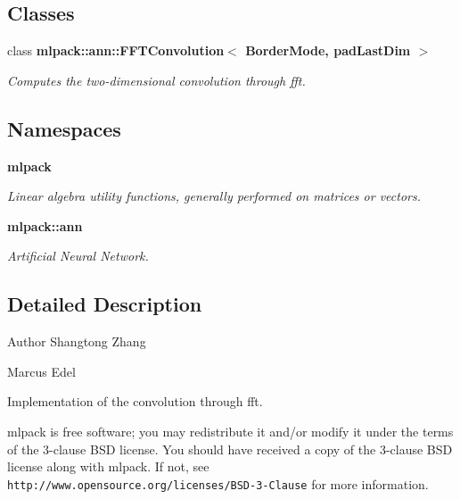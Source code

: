 \subsection*{Classes}
\begin{DoxyCompactItemize}
\item 
class {\bf mlpack\+::ann\+::\+F\+F\+T\+Convolution$<$ Border\+Mode, pad\+Last\+Dim $>$}
\begin{DoxyCompactList}\small\item\em Computes the two-\/dimensional convolution through fft. \end{DoxyCompactList}\end{DoxyCompactItemize}
\subsection*{Namespaces}
\begin{DoxyCompactItemize}
\item 
 {\bf mlpack}
\begin{DoxyCompactList}\small\item\em Linear algebra utility functions, generally performed on matrices or vectors. \end{DoxyCompactList}\item 
 {\bf mlpack\+::ann}
\begin{DoxyCompactList}\small\item\em Artificial Neural Network. \end{DoxyCompactList}\end{DoxyCompactItemize}


\subsection{Detailed Description}
\begin{DoxyAuthor}{Author}
Shangtong Zhang 

Marcus Edel
\end{DoxyAuthor}
Implementation of the convolution through fft.

mlpack is free software; you may redistribute it and/or modify it under the terms of the 3-\/clause B\+SD license. You should have received a copy of the 3-\/clause B\+SD license along with mlpack. If not, see {\tt http\+://www.\+opensource.\+org/licenses/\+B\+S\+D-\/3-\/\+Clause} for more information. 